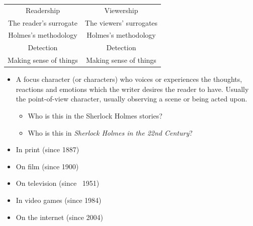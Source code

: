 \documentclass[a4paper,landscape,headrule,footrule,xetex]{foils}
\begin{document}
\begin{center}
  \begin{tabular}{cc}
    Readership & Viewership \\
    The reader’s surrogate & The viewers’ surrogates \\
    Holmes’s methodology & Holmes’s methodology\\
    Detection & Detection \\
    Making sense of things & Making sense of things
  \end{tabular}

  \begin{itemize}
  \item {} A focus character (or characters) who
    voices or experiences the thoughts, reactions and emotions which
    the writer desires the reader to have. Usually the point-of-view
    character, usually observing a scene or being acted upon.
    \begin{itemize}
    \item  Who is this in the Sherlock Holmes stories? \task
    \item Who is this in \textit{Sherlock Holmes in the 22nd Century}? \task
    \end{itemize}
  \end{itemize}

\end{center}
\begin{itemize}
\item In print (since 1887)
\item On film (since 1900)
\item On television (since ~1951)
\item In video games (since 1984)
\item On the internet (since 2004)
\end{itemize}
\end{document}
